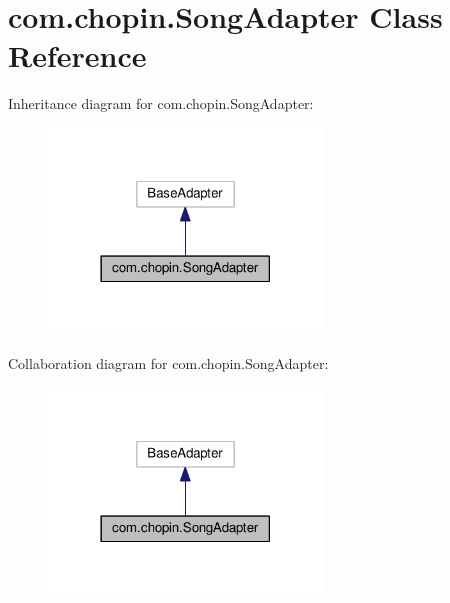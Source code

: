 \hypertarget{classcom_1_1chopin_1_1SongAdapter}{}\section{com.\+chopin.\+Song\+Adapter Class Reference}
\label{classcom_1_1chopin_1_1SongAdapter}


Inheritance diagram for com.\+chopin.\+Song\+Adapter\+:
\nopagebreak
\begin{figure}[H]
\begin{center}
\leavevmode
\includegraphics[width=206pt]{classcom_1_1chopin_1_1SongAdapter__inherit__graph}
\end{center}
\end{figure}


Collaboration diagram for com.\+chopin.\+Song\+Adapter\+:
\nopagebreak
\begin{figure}[H]
\begin{center}
\leavevmode
\includegraphics[width=206pt]{classcom_1_1chopin_1_1SongAdapter__coll__graph}
\end{center}
\end{figure}

